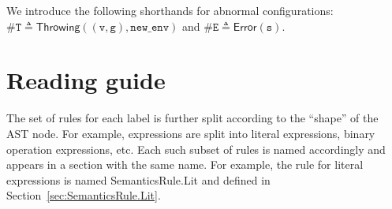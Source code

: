 \documentclass{book}
\newcommand\ThrowingConfig[0]{\texttt{\#T}}
\newcommand\ErrorConfig[0]{\texttt{\#E}}
\newcommand\Throwing[0]{\textsf{Throwing}}
\newcommand\Error[0]{\textsf{Error}}
\newcommand\newenv[0]{\texttt{new\_env}}
\newcommand\vg[0]{\texttt{g}}
\newcommand\vv[0]{\texttt{v}}
\newcommand\vs[0]{\texttt{s}}
\begin{document}
We introduce the following shorthands for abnormal configurations:
$\ThrowingConfig \triangleq \Throwing((\vv, \vg), \newenv)$
and $\ErrorConfig \triangleq \Error(\vs)$.




\chapter{Reading guide}

The set of rules for each label is further split according to the ``shape'' of the AST node.
For example, expressions are split into literal expressions, binary operation expressions, etc.
Each such subset of rules is named accordingly and appears in a section with the same name.
For example, the rule for literal expressions is named SemanticsRule.Lit and defined in
Section~\ref{sec:SemanticsRule.Lit}.
\end{document}
